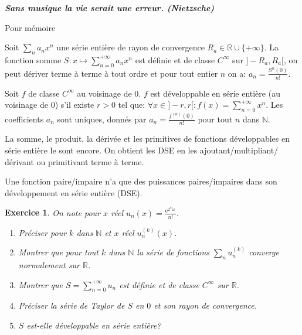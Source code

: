 \documentclass[17pt,a4paper,landscape]{article}
\newcommand{\R}{\mathbb{R}}
\newcommand{\N}{\mathbb{N}}
\newcommand{\E}{\mathrm{e}}
\newcommand{\I}{\mathrm{i}}
\theoremstyle{break}
\theoremstyle{break}
\newtheorem{Exo}{Exercice}
\begin{document}
\emph{\textbf{
	Sans musique la vie serait une erreur. (Nietzsche)
}}

\begin{bclogo}[couleur = green!30, arrondi = 0.1, logo = \bccoeur, barre = zigzag]{Pour mémoire}

Soit $\sum_n a_n x^n$ une série entière de rayon de convergence $R_a\in\R\cup\{+\infty\}$. La fonction somme $S:x\mapsto \sum_{n=0}^{+\infty}a_n x^n$ est définie et de classe $C^{\infty}$ sur $]-R_a,R_a[$, on peut dériver terme à terme à tout ordre et pour tout entier $n$ on a: $a_n=\frac{S^{n}(0)}{n!}$.

Soit $f$ de classe $C^{\infty}$ au voisinage de $0$. $f$ est développable en série entière (au voisinage de $0$) s'il existe $r>0$ tel que: $\forall x\in]-r,r[:f(x)=\sum_{n=0}^{+\infty}x^n$. Les coefficients $a_n$ sont  uniques, donnés par $a_n=\frac{f^{(n)}(0)}{n!}$ pour tout $n$ dans $\N$.

La somme, le produit, la dérivée et les primitives de fonctions développables en série entière le sont encore. On obtient les DSE en les ajoutant/multipliant/ dérivant ou primitivant terme à terme.


Une fonction paire/impaire n'a que des puissances paires/impaires dans son développement en série entière (DSE). 
\end{bclogo}
\vspace*{1cm}





	
\begin{Exo}
	On note pour $x$ réel  
	$u_n(x)=\frac{\E^{2^n \I x}}{n!}$.
		\begin{enumerate}
			\item
			Préciser pour $k$ dans $\N$ et $x$ réel $u_n^{(k)}(x)$.
			\item
			Montrer que pour tout $k$ dans $\N$ la série de fonctions $\sum_n u_n^{(k)}$ converge normalement sur $\R$.
			\item
			Montrer que $S=\sum_{n=0}^{+\infty}u_n$ est définie et de classe $C^{\infty}$ sur $\R$.
			\item
			Préciser la série de Taylor de $S$ en $0$ et son rayon de convergence.
			\item
			$S$ est-elle développable en série entière?
		\end{enumerate}
\end{Exo}
\end{document}
